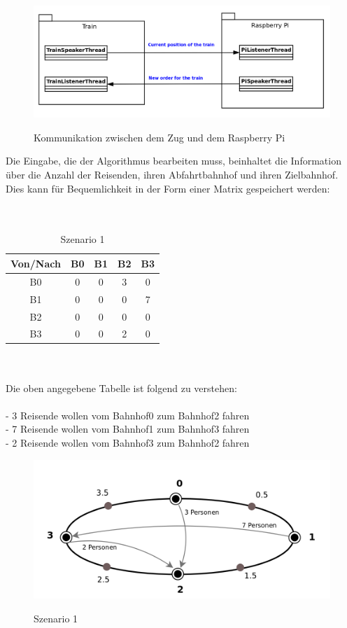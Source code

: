 \begin{figure}[H]	
\caption{Kommunikation zwischen dem Zug und dem Raspberry Pi}
\includegraphics[width=2\textwidth, width=470pt]{content/images/communication.png}
\label{pic:communication}
\end{figure}


Die Eingabe, die der Algorithmus bearbeiten muss, beinhaltet die Information über die Anzahl der Reisenden, ihren Abfahrtbahnhof und ihren Zielbahnhof. Dies kann für Bequemlichkeit in der Form einer Matrix gespeichert werden:\\
\\
\\
\begin{table}
\caption{Szenario 1}
\center
 \begin{tabular}{|c|c|c|c|c|}
 \hline
  Von/Nach & B0 & B1 & B2 & B3 \\ \hline
  B0 & 0 & 0 & 3 & 0\\   \hline
    B1 & 0 & 0 & 0 & 7 \\   \hline
      B2 & 0 & 0 & 0 & 0\\   \hline
        B3 & 0 & 0 & 2 & 0 \\   \hline
 \end{tabular}
\end{table}
\\
\\
Die oben angegebene Tabelle ist folgend zu verstehen:\\
\\
- 3 Reisende wollen vom Bahnhof0 zum Bahnhof2 fahren\\
- 7 Reisende wollen vom Bahnhof1 zum Bahnhof3 fahren\\
- 2 Reisende wollen vom Bahnhof3 zum Bahnhof2 fahren\\

\begin{figure}[H]	
\caption{Szenario 1}
\includegraphics[width=2\textwidth, width=470pt]{content/images/szenario1.png}
\label{pic:szenario1}
\end{figure}


